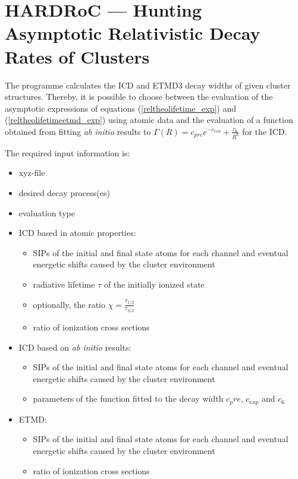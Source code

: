 \section{HARDRoC --- Hunting Asymptotic Relativistic Decay Rates of Clusters}

The programme calculates the \ac{ICD} and \ac{ETMD}3 decay widths
of given cluster structures. Thereby, it is possible to choose between
the evaluation of the asymptotic expressions of equations
(\ref{reltheolifetime_exp}) and (\ref{reltheolifetimeetmd_exp}) using
atomic data and the evaluation of a function obtained from fitting
\emph{ab initio} results to $\Gamma(R) = c_{pre} e^{-c_{exp}} + \frac{c_6}{R^6}$
for the ICD.

The required input information is:
\begin{itemize}
 \item xyz-file
 \item desired decay process(es)
 \item evaluation type
 \item ICD based in atomic properties:
       \begin{itemize}
        \item \ac{SIP}s of the initial and final state atoms for each channel and
              eventual energetic shifts caused by the cluster environment
        \item radiative lifetime $\tau$ of the initially ionized state
        \item optionally, the ratio $\chi=\frac{\tau_{1/2}}{\tau_{3/2}}$
        \item ratio of ionization cross sections
       \end{itemize}
 \item ICD based on \emph{ab initio} results:
       \begin{itemize}
        \item \ac{SIP}s of the initial and final state atoms for each channel and
              eventual energetic shifts caused by the cluster environment
        \item parameters of the function fitted to the decay width $c_pre$,
              $c_{exp}$ and $c_6$
       \end{itemize}
 \item ETMD: 
       \begin{itemize}
        \item \ac{SIP}s of the initial and final state atoms for each channel and
              eventual energetic shifts caused by the cluster environment
        \item ratio of ionization cross sections
       \end{itemize}
\end{itemize}

